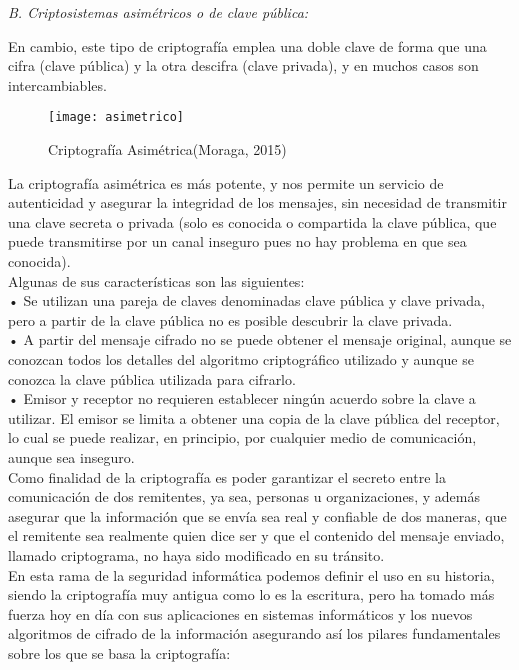 \documentclass[9pt,24pt,twocolumn]{article}
\begin{document}
\textit{B.  Criptosistemas asimétricos o de clave pública:}

{En cambio, este tipo de criptografía emplea una doble clave de forma que una cifra (clave pública) y la otra descifra (clave privada), y en muchos casos son intercambiables.}

\begin{figure}[h]
  \centering
    \texttt{[image: asimetrico]}
  \caption{Criptografía Asimétrica(Moraga, 2015)}
  \label{fig:asim}
\end{figure}

{La criptografía asimétrica es más potente, y nos permite un servicio de autenticidad y asegurar la integridad de los mensajes, sin necesidad de transmitir una clave secreta o privada (solo es conocida o compartida la clave pública, que puede transmitirse por un canal inseguro pues no hay problema en que sea conocida).}
\\

{Algunas de sus características son las siguientes:}
\\

{• Se utilizan una pareja de claves denominadas clave pública y clave privada, pero a partir de la clave pública no es posible descubrir la clave privada.}
\\

{• A partir del mensaje cifrado no se puede obtener el mensaje original, aunque se conozcan todos los detalles del algoritmo criptográfico utilizado y aunque se conozca la clave pública utilizada para cifrarlo.}
\\

{• Emisor y receptor no requieren establecer ningún acuerdo sobre la clave a utilizar. El emisor se limita a obtener una copia de la clave pública del receptor, lo cual se puede realizar, en principio, por cualquier medio de comunicación, aunque sea inseguro.}
\\

{Como finalidad de la criptografía es poder garantizar el secreto entre la comunicación de dos remitentes, ya sea, personas u organizaciones, y además asegurar que la información que se envía sea real y confiable de dos maneras, que el remitente sea realmente quien dice ser y que el contenido del mensaje enviado, llamado criptograma, no haya sido modificado en su tránsito.}
\\

{En esta rama de la seguridad informática podemos definir el uso en su historia, siendo la criptografía muy antigua como lo es la escritura, pero ha tomado más fuerza hoy en día con sus aplicaciones en sistemas informáticos y los nuevos algoritmos de cifrado de la información asegurando así los pilares fundamentales sobre los que se basa la criptografía:}
\\
\end{document}

